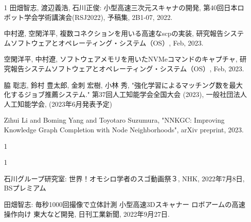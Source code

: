 \begin{発表}{1}
田畑智志, 渡辺義浩, 石川正俊: 小型高速三次元スキャナの開発, 第40回日本ロボット学会学術講演会(RSJ2022), 予稿集, 2B1-07, 2022.


中村遼, 空閑洋平, 複数コネクションを用いる高速なscpの実装, 研究報告システムソフトウェアとオペレーティング・システム（OS）, Feb, 2023.

空閑洋平, 中村遼, ソフトウェアメモリを用いたNVMeコマンドのキャプチャ, 研究報告システムソフトウェアとオペレーティング・システム（OS）, Feb, 2023.


脇 聡志, 鈴村 豊太郎, 金刺 宏樹, 小林 秀, "強化学習によるマッチング数を最大化するジョブ推薦システム." 第37回人工知能学会全国大会 (2023),  一般社団法人 人工知能学会, (2023年6月発表予定)


Zihui Li and Boming Yang and Toyotaro Suzumura, "NNKGC: Improving Knowledge Graph Completion with Node Neighborhoods", arXiv preprint, 2023.

\end{発表}

\begin{特記}{1}


\end{特記}

\begin{報道}{1}


石川グループ研究室: 世界！オモシロ学者のスゴ動画祭３, NHK, 2022年7月8日, BSプレミアム


田畑智志: 毎秒1000回撮像で立体計測 小型高速3Dスキャナー ロボアームの高速操作向け 東大など開発, 日刊工業新聞, 2022年9月27日.


\end{報道}
